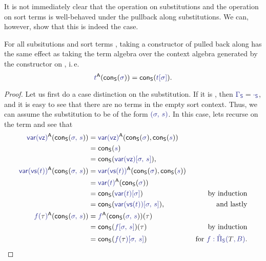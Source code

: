 It is not immediately clear that the operation on substitutions and the operation
on sort terms is well-behaved under the pullback along substitutions.
We can, however, show that this is indeed the case.

\begin{lemma}
For all subsitutions \tqm{\IFSub{\sigma}{\Gamma_\Sc}{\Delta_\Sc}} and sort terms
, taking a constructor of  pulled back
along \tqm{\sigma} has the same effect as taking the term algebra over the context
algebra generated by the constructor on \tqm{\sigma}, i.\,e.
\begin{equation*}
\tqm{t}^\CC(\IFconS{\sigma}) = \IFconS{t[\sigma]} \text{.}
\end{equation*}
\end{lemma}

\begin{proof}
Let us first do a case distinction on the substitution.
If it is \tqm{\epsilon}, then $\tqm{\Gamma_\Sc} = \tqm{\cdot_\Sc} $,
and it is easy to see that there are no terms in the empty sort context.
Thus, we can assume the substitution to be of the form $\tqm{(\sigma,\, s)}$.
In this case, lets recurse on the term and see that
\begin{align*}
\tqm{\var(\vz)}^\CC(\IFconS{\sigma,\, s})
  &= \tqm{\var(\vz)}^\CC(\IFconS{\sigma}, \IFconS{s}) \\
  &= \IFconS{s} \\
  &= \IFconS{\var(\vz)[\sigma,\, s]} \text{,} \\
\tqm{\var(\vs(t))}^\CC(\IFconS{\sigma,\, s})
  &= \tqm{\var(\vs(t))}^\CC(\IFconS{\sigma}, \IFconS{s}) \\
  &= \tqm{\var(t)}^\CC(\IFconS{\sigma}) \\
  &= \IFconS{\var(t)[\sigma]} & \text{ by induction} \\
  &= \IFconS{\var(\vs(t))[\sigma,\, s]} \text, & \text{ and lastly} \\
\tqm{f(\bltau)}^\CC(\IFconS{\sigma,\, s})
  &= \tqm{f}^\CC(\IFconS{\sigma,\, s})(\bltau) \\
  &= \IFconS{f[\sigma,\, s]}(\bltau) & \text{ by induction} \\
  &= \IFconS{f(\bltau)[\sigma,\, s]} & \text{ for \tqm{f : \ExtPiS{T}{B}}.}
\end{align*}
\end{proof}








